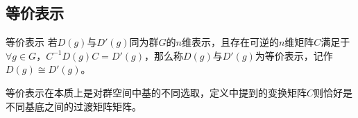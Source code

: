 
\begin{issues}
\issueDraft
\issueMissDepend
\end{issues}

\subsection{等价表示}
\begin{definition}{等价表示}
若$D(g)$与$D'(g)$同为群$G$的$n$维表示，且存在可逆的$n$维矩阵$C$满足于$\forall g\in G$，$C^{-1}D(g)C=D'(g)$，那么称$D(g)$与$D'(g)$为等价表示，记作$D(g)\cong D'(g)$。
\end{definition}

等价表示在本质上是对群空间中基的不同选取，定义中提到的变换矩阵$C$则恰好是不同基底之间的过渡矩阵矩阵。